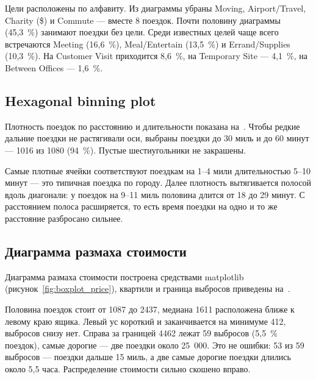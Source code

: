 \documentclass[a4paper,14pt]{extarticle}
\begin{document}

Цели расположены по алфавиту. Из диаграммы убраны Moving, Airport/Travel, Charity (\$) и Commute — вместе 8 поездок. Почти половину диаграммы (45,3~\%) занимают поездки без цели. Среди известных целей чаще всего встречаются Meeting (16,6~\%), Meal/Entertain (13,5~\%) и Errand/Supplies (10,3~\%). На Customer Visit приходится 8,6~\%, на Temporary Site — 4,1~\%, на Between Offices — 1,6~\%.

\subsection{Hexagonal binning plot}

Плотность поездок по расстоянию и длительности показана на~. Чтобы редкие дальние поездки не растягивали оси, выбраны поездки до 30 миль и до 60 минут — 1016 из 1080 (94~\%). Пустые шестиугольники не закрашены.


Самые плотные ячейки соответствуют поездкам на 1–4 мили длительностью 5–10 минут — это типичная поездка по городу. Далее плотность вытягивается полосой вдоль диагонали: у поездок на 9–11 миль половина длится от 18 до 29 минут. С расстоянием полоса расширяется, то есть время поездки на одно и то же расстояние разбросано сильнее.

\subsection{Диаграмма размаха стоимости}

Диаграмма размаха стоимости построена средствами matplotlib (рисунок~\ref{fig:boxplot_price}), квартили и граница выбросов приведены на~.



Половина поездок стоит от 1087 до 2437, медиана 1611 расположена ближе к левому краю ящика. Левый ус короткий и заканчивается на минимуме 412, выбросов снизу нет. Справа за границей 4462 лежат 59 выбросов (5,5~\% поездок), самые дорогие — две поездки около 25~000. Это не ошибки: 53 из 59 выбросов — поездки дальше 15 миль, а две самые дорогие поездки длились около 5,5 часа. Распределение стоимости сильно скошено вправо.
\end{document}
